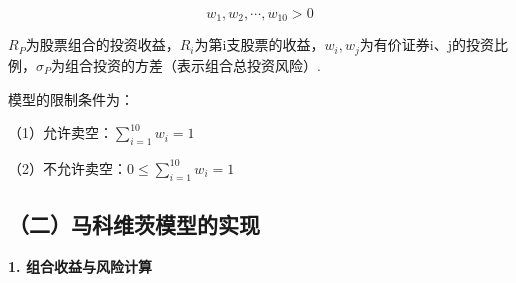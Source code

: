 \begin{equation}
w_1,w_2,\cdots,w_{10}>0
\end{equation}

$R_P$为股票组合的投资收益，$R_i$为第i支股票的收益，$w_i,w_j$为有价证券i、j的投资比例，$\sigma_P$为组合投资的方差（表示组合总投资风险）.

模型的限制条件为：

（1）允许卖空：$\sum_{i=1}^{10} w_i=1$

（2）不允许卖空：$0\leq\sum_{i=1}^{10} w_i=1$

\subsection{（二）马科维茨模型的实现}

\textbf{1. 组合收益与风险计算}








